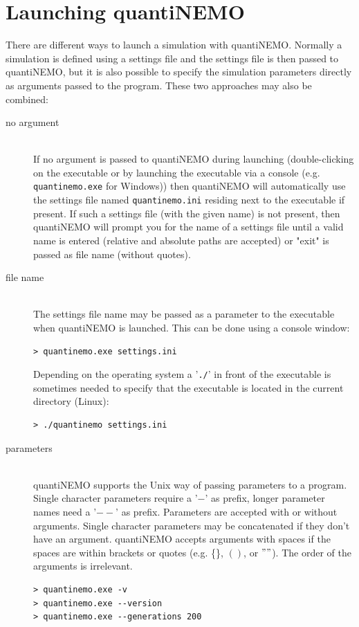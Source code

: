 \documentclass[letterpaper,12pt,oneside]{book}
\begin{document}
\section{Launching quantiNEMO}\label{launchQuantiNemo}
There are different ways to launch a simulation with quantiNEMO. Normally a simulation is defined using a settings file and the settings file is then passed to quantiNEMO, but it is also possible to specify the simulation parameters directly as arguments passed to the program. These two approaches may also be combined:

\begin{description}
\item[no argument]\hspace*{\fill}\\ 
If no argument is passed to quantiNEMO during launching (double-clicking on the executable or by launching the executable via a console (e.g. \texttt{quantinemo.exe} for Windows)) then quantiNEMO will automatically use the settings file named \texttt{quantinemo.ini} residing next to the executable if present. If such a settings file (with the given name) is not present, then quantiNEMO will prompt you for the name of a settings file until a valid name is entered (relative and absolute paths are accepted) or "exit" is passed as file name (without quotes).   

\item[file name]\hspace*{\fill}\\ 
The settings file name may be passed as a parameter to the executable when quantiNEMO is launched. This can be done using a console window:

\begin{lstlisting}[frame=single]
> quantinemo.exe settings.ini
\end{lstlisting}

Depending on the operating system a '\texttt{./}' in front of the executable is sometimes needed to specify that the executable is located in the current directory (Linux):
\begin{lstlisting}[frame=single]
> ./quantinemo settings.ini
\end{lstlisting}

\item[parameters]\hspace*{\fill}\\ 
quantiNEMO supports the Unix way of passing parameters to a program. Single character parameters require a '$-$' as prefix, longer parameter names need a '$--$' as prefix. Parameters are accepted with or without arguments. Single character parameters may be concatenated if they don't have an argument. quantiNEMO accepts arguments with spaces if the spaces are within brackets or quotes (e.g. \{\}, $()$, or $""$). The order of the arguments is irrelevant.
\begin{lstlisting}[frame=single]
> quantinemo.exe -v
> quantinemo.exe --version
> quantinemo.exe --generations 200
\end{lstlisting}


\end{description}
\end{document}
